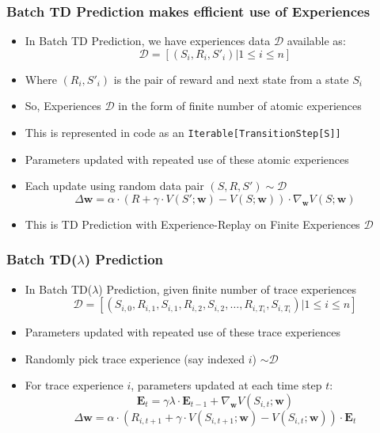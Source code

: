 \documentclass[handout]{beamer}
\begin{document}
\begin{frame}
\frametitle{Batch TD Prediction makes efficient use of Experiences}
\pause
\begin{itemize}[<+->]
\item In Batch TD Prediction, we have experiences data $\mathcal{D}$ available as:
$$\mathcal{D} = [(S_i, R_i, S'_i) | 1 \leq i \leq n]$$
\item Where $(R_i, S'_i)$ is the pair of reward and next state from a state $S_i$
\item So, Experiences $\mathcal{D}$ in the form of finite number of atomic experiences
\item This is represented in code as an \lstinline{Iterable[TransitionStep[S]]}
\item Parameters updated with repeated use of these atomic experiences
\item Each update using random data pair $(S,R,S') \sim \mathcal{D}$
$$\Delta \bm{w} = \alpha \cdot (R + \gamma \cdot V(S'; \bm{w}) - V(S; \bm{w})) \cdot \nabla_{\bm{w}} V(S; \bm{w})$$
\item This is TD Prediction with Experience-Replay on Finite Experiences $\mathcal{D}$
\end{itemize}
\end{frame}

\begin{frame}
\frametitle{Batch TD($\lambda$) Prediction}
\pause
\begin{itemize}[<+->]
\item In Batch TD($\lambda$) Prediction, given finite number of trace experiences
$$\mathcal{D} = [(S_{i,0}, R_{i,1}, S_{i,1}, R_{i,2}, S_{i,2}, \ldots, R_{i,T_i}, S_{i,T_i}) | 1 \leq i \leq n]$$
\item Parameters updated with repeated use of these trace experiences
\item Randomly pick trace experience (say indexed $i$) $\sim \mathcal{D}$
\item For trace experience $i$, parameters updated at each time step $t$:
$$\bm{E}_t = \gamma \lambda \cdot \bm{E}_{t-1} + \nabla_{\bm{w}} V(S_{i,t};\bm{w})$$
$$\Delta \bm{w} = \alpha \cdot (R_{i,t+1} + \gamma \cdot V(S_{i,t+1}; \bm{w}) - V(S_{i,t}; \bm{w})) \cdot \bm{E}_t$$
\end{itemize}
\end{frame}
\end{document}
